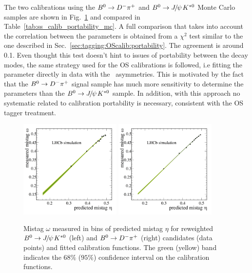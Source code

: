 The two calibrations using the  $B^0\rightarrow D^-\pi^+$ and $\Bz\to\jpsi\Kstarz$ Monte Carlo samples are shown in
Fig.~\ref{fig:ss_calib_portability_mc} and compared in
Table~\ref{tab:ss_calib_portability_mc}. A full comparison that takes into account the correlation between the
parameters is obtained from a $\chi^2$ test similar to the one described in Sec.~\ref{sec:tagging:OScalib:portability}. The agreement is around \SI{0.1}{\sigma}. Even thought this test doesn't hint to
issues of portability between the decay modes, the same strategy used for the OS calibrations is followed, i.e fitting the
parameter directly in data with the \CP~asymmetries. This is motivated by the fact that 
the $B^0\rightarrow D^-\pi^+$ signal sample has much more sensitivity to determine the
parameters than the $\Bz\to\jpsi\Kstarz$ sample. In addition, with this approach no systematic related to calibration
portability is necessary, consistent with the OS tagger treatment.

\begin{figure}[t]
        \begin{center}
                \includegraphics[width=0.45\textwidth]{04Flavourtagging/figs/SS_Combination_Calibration_BdJpsiKst_MC.png}
                \includegraphics[width=0.45\textwidth]{04Flavourtagging/figs/SS_Combination_Calibration_BdDpi_MC.png}
        \end{center}
        \vspace{-2mm}
        \caption{Mistag $\omega$ measured in bins of predicted mistag $\eta$ for reweighted $\Bz\to\jpsi\Kstarz$ (left) and $B^0\rightarrow D^-\pi^+$ (right) candidates (data points) and fitted calibration functions. The green (yellow) band indicates the $68\%$ ($95\%$) confidence interval on the calibration functions.}
        \label{fig:ss_calib_portability_mc}
\end{figure}

